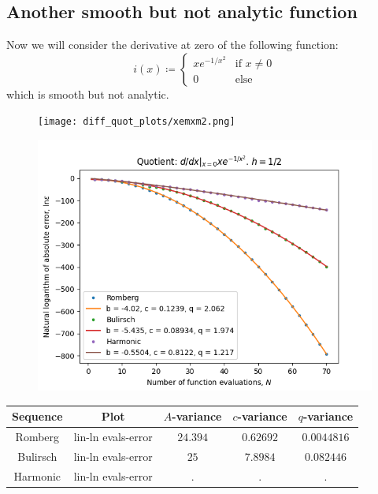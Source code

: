 \subsection{Another smooth but not analytic function}

Now we will consider the derivative at zero of the following function:
\[
i(x)\coloneqq \begin{cases}
xe^{-1/x^2} & \text{if } x \neq 0\\
0 & \text{else}
\end{cases}
\]
which is smooth but not analytic.
\begin{figure}[H]
\centering
\begin{minipage}{0.45\textwidth}
\centering
\texttt{[image: diff\_quot\_plots/xemxm2.png]}
\end{minipage}
\begin{minipage}{0.45\textwidth}
\centering
\includegraphics[scale=0.45]{diff_quot_plots/xemxm2_hp_trend.png}
\end{minipage}
\end{figure}

\begin{table}[H]
    \centering
    \begin{tabular}{c|c||c|c|c}
Sequence & Plot & \(A\)-variance & \(c\)-variance & \(q\)-variance\\\hline
Romberg & lin-ln evals-error & \(24.394\) & \(0.62692\) & \(0.0044816\) \\
Bulirsch & lin-ln evals-error & \(25\) & \(7.8984\) & \(0.082446\) \\
Harmonic & lin-ln evals-error & . & . & . \\
    \end{tabular}
    \label{tab:my_label}
\end{table}

